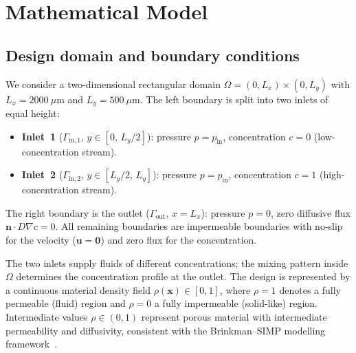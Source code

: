 \section{Mathematical Model}
\label{sec:model}

\subsection{Design domain and boundary conditions}
We consider a two-dimensional rectangular domain \(\Omega = (0,L_x) \times (0,L_y)\) with \(L_x = 2000\ \mu\text{m}\) and \(L_y = 500\ \mu\text{m}\).
The left boundary is split into two inlets of equal height:
\begin{itemize}
    \item \textbf{Inlet~1} (\(\Gamma_{\text{in},1}\), \(y\in[0,\,L_y/2]\)): pressure \(p = p_{\text{in}}\), concentration \(c = 0\) (low-concentration stream).
    \item \textbf{Inlet~2} (\(\Gamma_{\text{in},2}\), \(y\in[L_y/2,\,L_y]\)): pressure \(p = p_{\text{in}}\), concentration \(c = 1\) (high-concentration stream).
\end{itemize}
The right boundary is the outlet (\(\Gamma_{\text{out}}\), \(x = L_x\)): pressure \(p = 0\), zero diffusive flux \(\mathbf{n}\cdot D\nabla c = 0\).
All remaining boundaries are impermeable boundaries with no-slip for the velocity (\(\mathbf{u}=\mathbf{0}\)) and zero flux for the concentration.

The two inlets supply fluids of different concentrations; the mixing pattern inside \(\Omega\) determines the concentration profile at the outlet.
The design is represented by a continuous material density field
\(\rho(\mathbf{x}) \in [0,1]\), where \(\rho=1\) denotes
a fully permeable (fluid) region and \(\rho=0\) a fully
impermeable (solid-like) region.
Intermediate values $\rho\in(0,1)$ represent porous material
with intermediate permeability and diffusivity, consistent with
the Brinkman--SIMP modelling framework~\cite{borrvall2003}.


